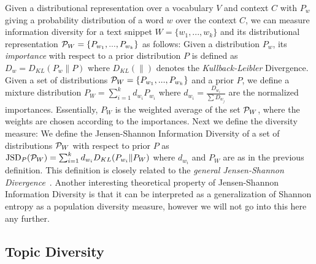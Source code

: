 \documentclass{article} %
\begin{document}
Given a distributional representation over a vocabulary $V$ and context $C$ with $P_w$ giving a probability distribution of a
word $w$ over the context $C$, we can measure information diversity for a text snippet $W=\{w_1,...,w_k\}$ and its
distributional representation ${\mathcal P}_{W}=\{P_{w_1},...,P_{w_k}\}$ as follows:
\bed\label{importance}
Given a distribution $P_w$, its {\sl importance} with respect to a
prior distribution $P$ is defined as $D_w = D_{KL}(P_w\|P)$ where $D_{KL}(\|)$ denotes the
{\sl Kullback-Leibler} Divergence.
\eed
\bed\label{mixture}
Given a set of distributions ${\mathcal P}_{W}=\{P_{w_1},...,P_{w_k}\}$ and a
prior $P$, we
define a mixture distribution $P_W=\sum_{i=1}^k d_{w_i} P_{w_i}$ where $d_{w_i}=\frac{D_{w_i}}{\sum D_{w_j}}$ are the normalized
importances.
\eed
Essentially, $P_W$ is the weighted average of the set ${\mathcal P}_{W}$, where
the weights are chosen according to the importances. Next we
define the diversity measure:
\bed\label{diversity}
We define the Jensen-Shannon Information Diversity of a set of
distributions ${\mathcal P}_W$ with respect to 
prior $P$ as $\mbox{JSD}_P({\mathcal P}_W)=\sum_{i=1}^k d_{w_i}D_{KL}(P_{w_i}\|P_W)$
where $d_{w_i}$ and $P_W$ are as in the previous definition.
\eed
This definition is closely related to the 
{\em general Jensen-Shannon Divergence}~\cite{FugledeTopsoe}. Another
interesting theoretical property of Jensen-Shannon Information
Diversity is that it can be interpreted as a generalization of Shannon
entropy as a population diversity measure, however we will not go
into this here any further. 


\subsection{Topic Diversity}
\label{sec:topic-diversity}
\end{document}
